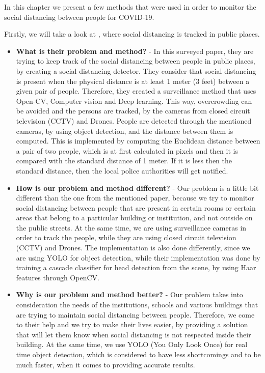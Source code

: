 \documentclass[runningheads,a4paper,11pt]{report}
\begin{document}
In this chapter we present a few methods that were used in order to monitor the social distancing between people for COVID-19.

Firstly, we will take a look at \cite{OpenCV}, where social distancing is tracked in public places.

\begin{itemize}
	\item \textbf{What is their problem and method?} - In this surveyed paper, they are trying to keep track of the social distancing between people in public places, by creating a social distancing detector. They consider that social distancing is present when the physical distance is at least 1 meter (3 feet) between a given pair of people. Therefore, they created a surveillance method that uses Open-CV, Computer vision and Deep learning. This way, overcrowding can be avoided and the persons are tracked, by the cameras from closed circuit television (CCTV) and Drones. People are detected through the mentioned cameras, by using object detection, and the distance between them is computed. This is implemented by computing the Euclidean distance between a pair of two people, which is at first calculated in pixels and then it is compared with the standard distance of 1 meter. If it is less then the standard distance, then the local police authorities will get notified.
	\item \textbf{How is our problem and method different?} - Our problem is a little bit different than the one from the mentioned paper, because we try to monitor social distancing between people that are present in certain rooms or certain areas that belong to a particular building or institution, and not outside on the public streets. At the same time, we are using surveillance cameras in order to track the people, while they are using closed circuit television (CCTV) and Drones. The implementation is also done differently, since we are using  YOLO for object detection, while their implementation was done by training a cascade classifier for head detection from the scene, by using Haar features through OpenCV.
	\item \textbf{Why is our problem and method better?} - Our problem takes into consideration the needs of the institutions, schools and various buildings that are trying to maintain social distancing between people. Therefore, we come to their help and we try to make their lives easier, by providing a solution that will let them know when social distancing is not respected inside their building. At the same time, we use YOLO  (You Only Look Once) for real time object detection, which is considered to have less shortcomings and to be much faster, when it comes to providing accurate results.
\end{itemize}
\end{document}
